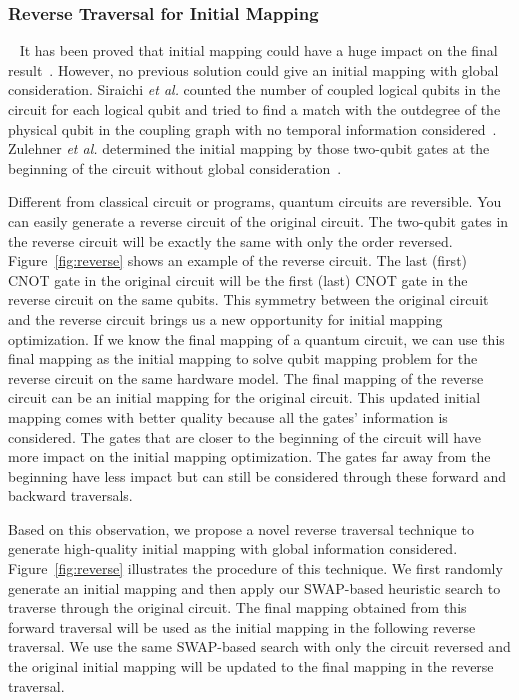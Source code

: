 \documentclass[journal,10pt,twocolumn]{IEEEtran}
\begin{document}
\subsubsection{Reverse Traversal for Initial Mapping}~\label{sec:init}
It has been proved that initial mapping could have a huge impact on the final result~\cite{siraichi2018qubit,zulehner2018efficient}.
However, no previous solution could give an initial mapping with global consideration. 
Siraichi \textit{et al.} counted the number of coupled logical qubits in the circuit for each logical qubit and tried to find a match with the outdegree of the physical qubit in the coupling graph with no temporal information considered~\cite{siraichi2018qubit}.
Zulehner \textit{et al.} determined the initial mapping by those two-qubit gates at the beginning of the circuit without global consideration~\cite{zulehner2018efficient}.

Different from classical circuit or programs, quantum circuits are reversible. You can easily generate a reverse circuit of the original circuit. 
The two-qubit gates in the reverse circuit will be exactly the same with only the order reversed. 
Figure~\ref{fig:reverse} shows an example of the reverse circuit. 
The last (first) CNOT gate in the original circuit will be the first (last) CNOT gate in the reverse circuit on the same qubits.
This symmetry between the original circuit and the reverse circuit brings us a new opportunity for initial mapping optimization.
If we know the final mapping of a quantum circuit, we can use this final mapping as the initial mapping to solve qubit mapping problem for the reverse circuit on the same hardware model. 
The final mapping of the reverse circuit can be an initial mapping for the original circuit. 
This updated initial mapping comes with better quality because all the gates' information is considered. The gates that are closer to the beginning of the circuit will have more impact on the initial mapping optimization. 
The gates far away from the beginning have less impact but can still be considered through these forward and backward traversals.

Based on this observation, we propose a novel reverse traversal technique to generate high-quality initial mapping with global information considered. 
Figure~\ref{fig:reverse} illustrates the procedure of this technique. 
We first randomly generate an initial mapping and then apply our SWAP-based heuristic search to traverse through the original circuit. 
The final mapping obtained from this forward traversal will be used as the initial mapping in the following reverse traversal. 
We use the same SWAP-based search with only the circuit reversed and the original initial mapping will be updated to the final mapping in the reverse traversal.
\end{document}
